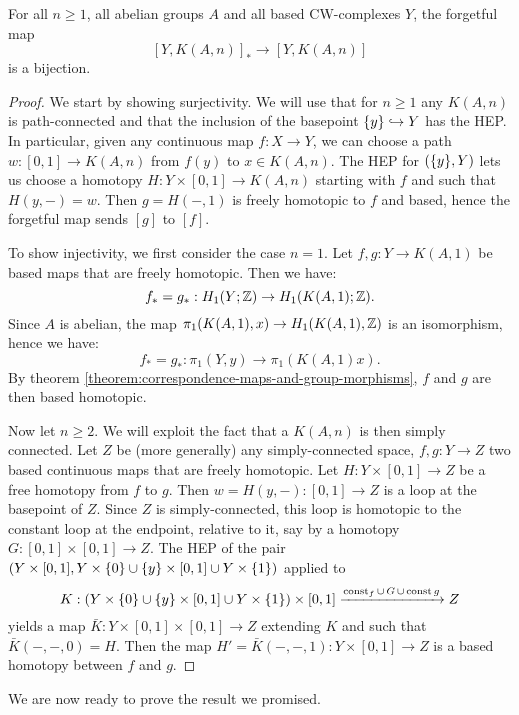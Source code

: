 \begin{lemma}
For all $n\ge1$, all abelian groups $A$ and all based CW-complexes $Y$, the forgetful map
\[[Y,K(A,n)]_*\to [Y,K(A,n)]\]
is a bijection.
\end{lemma}

\begin{proof}
We start by showing surjectivity. We will use that for $n\ge1$ any $K(A,n)$ is path-connected and that the inclusion of the basepoint $\{y\}\hookrightarrow Y$ has the HEP. In particular, given any continuous map $f:X\to Y$, we can choose a path $w:[0,1]\to K(A,n)$ from $f(y)$ to $x\in K(A,n)$. The HEP for $(\{y\},Y)$ lets us choose a homotopy $H:Y\times[0,1]\to K(A,n)$ starting with $f$ and such that $H(y,-)=w$. Then $g=H(-,1)$ is freely homotopic to $f$ and based, hence the forgetful map sends $[g]$ to $[f]$.

To show injectivity, we first consider the case $n=1$. Let $f,g:Y\to K(A,1)$ be based maps that are freely homotopic. Then we have:
\[f_*=g_*:H_1(Y;{\mathbb Z})\to H_1(K(A,1);{\mathbb Z}).\]
Since $A$ is abelian, the map $\pi_1(K(A,1),x)\to H_1(K(A,1),{\mathbb Z})$ is an isomorphism, hence we have:
\[f_*=g_*:\pi_1(Y,y)\to \pi_1(K(A,1)x).\]
By theorem \ref{theorem:correspondence-maps-and-group-morphisms}, $f$ and $g$ are then based homotopic.

Now let $n\ge2$. We will exploit the fact that a $K(A,n)$ is then simply connected. Let $Z$ be (more generally) any simply-connected space, $f,g:Y\to Z$ two based continuous maps that are freely homotopic. Let $H:Y\times[0,1]\to Z$ be a free homotopy from $f$ to $g$. Then $w=H(y,-):[0,1]\to Z$ is a loop at the basepoint of $Z$. Since $Z$ is simply-connected, this loop is homotopic to the constant loop at the endpoint, relative to it, say by a homotopy $G:[0,1]\times[0,1]\to Z$. The HEP of the pair $(Y\times[0,1],Y\times\{0\}\cup\{y\}\times[0,1]\cup Y\times\{1\})$ applied to
\[K:(Y\times\{0\}\cup\{y\}\times[0,1]\cup Y\times\{1\})\times[0,1]\xrightarrow{\operatorname{const}_f\cup\,G\,\cup\, \operatorname{const} g} Z\]
yields a map $\bar K:Y\times[0,1]\times[0,1]\to Z$ extending $K$ and such that $\bar K(-,-,0)=H$. Then the map $H'=\bar K(-,-,1):Y\times[0,1]\to Z$ is a based homotopy between $f$ and $g$.
\end{proof}

We are now ready to prove the result we promised.

